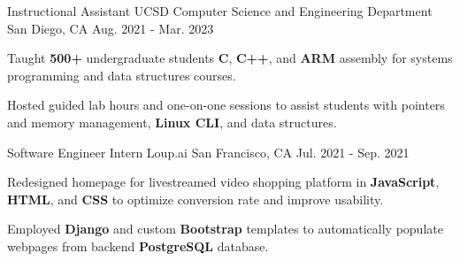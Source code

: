 \begin{cventries}
\cventry
  {Instructional Assistant} %
  {UCSD Computer Science and Engineering Department} %
  {San Diego, CA} %
  {Aug. 2021 - Mar. 2023} %
  {
    \begin{cvitems} %
      \item {Taught \textbf{500+} undergraduate students \textbf{C}, \textbf{C++}, and \textbf{ARM} assembly for systems programming and data structures courses.}
      \item {Hosted guided lab hours and one-on-one sessions to assist students with pointers and memory management, \textbf{Linux CLI}, and data structures.}
    \end{cvitems}
  }


\cventry
  {Software Engineer Intern} %
  {Loup.ai} %
  {San Francisco, CA} %
  {Jul. 2021 - Sep. 2021} %
  {
    \begin{cvitems} %
      \item {Redesigned homepage for livestreamed video shopping platform in \textbf{JavaScript}, \textbf{HTML}, and \textbf{CSS} to optimize conversion rate and improve usability.}
      \item {Employed \textbf{Django} and custom \textbf{Bootstrap} templates to automatically populate webpages from backend \textbf{PostgreSQL} database.}
    \end{cvitems}
  }



\end{cventries}

